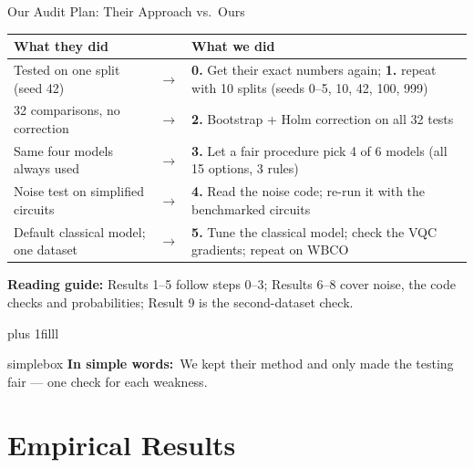 \documentclass[aspectratio=169,11pt,t,xcolor={table}]{beamer}
\newcommand{\insimple}[1]{%
  \par\vskip 0pt plus 1filll
  \begin{beamercolorbox}[wd=\textwidth,sep=4pt,rounded=true]{simplebox}%
    \small\textbf{\textcolor{qamber!75!black}{In simple words:}}\ #1%
  \end{beamercolorbox}\vskip1pt}
\newcommand{\secquestion}{}
\begin{document}
\begin{frame}{Our Audit Plan: Their Approach vs.\ Ours}
  \centering\footnotesize
  \renewcommand{\arraystretch}{1.15}
  \begin{tabular}{@{}L{48mm}c L{82mm}@{}}
    \toprule
    \textbf{What they did} & & \textbf{What we did}\\
    \midrule
    Tested on one split (seed 42)         & $\rightarrow$ & \textbf{0.} Get their exact numbers again; \textbf{1.} repeat with 10 splits (seeds 0--5, 10, 42, 100, 999) \\
    32 comparisons, no correction         & $\rightarrow$ & \textbf{2.} Bootstrap + Holm correction on all 32 tests \\
    Same four models always used          & $\rightarrow$ & \textbf{3.} Let a fair procedure pick 4 of 6 models (all 15 options, 3 rules) \\
    Noise test on simplified circuits     & $\rightarrow$ & \textbf{4.} Read the noise code; re-run it with the benchmarked circuits \\
    Default classical model; one dataset  & $\rightarrow$ & \textbf{5.} Tune the classical model; check the VQC gradients; repeat on WBCO \\
    \bottomrule
  \end{tabular}\par
  \vspace{1.5mm}
  {\scriptsize\color{qteal}\textbf{Reading guide:} Results 1--5 follow steps 0--3; Results 6--8 cover noise, the code checks and probabilities; Result 9 is the second-dataset check.\par}
  \insimple{We kept their method and only made the testing fair --- one check for each weakness.}
\end{frame}

\renewcommand{\secquestion}{What did the numbers actually show?}
\section{Empirical Results}
\end{document}
